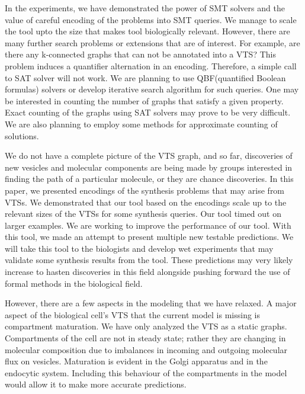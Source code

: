 \noindent 
%
In the experiments, we have demonstrated the power of SMT solvers and the
value of careful encoding of the problems into SMT queries. 
%
We manage to scale the tool upto the size that makes tool biologically relevant. However, there are many further search problems or extensions that are of interest. 
%
For example, are there any k-connected graphs that can not be annotated into a VTS? 
%
This problem induces a quantifier alternation in an encoding. Therefore, a simple call to SAT solver will not work. 
%
We are planning to use QBF(quantified Boolean
formulas) solvers or develop iterative search algorithm for such queries.
%
One may be interested in counting the number of graphs that satisfy a given
property. 
%
Exact counting of the graphs using SAT solvers may prove to be very
difficult. 
%
We are also planning to employ some methods for approximate counting
of solutions.

We do not have a complete picture of the VTS graph, and so far, discoveries of new vesicles and molecular components are being made by groups interested in finding the path of a particular molecule, or they are chance discoveries. 
%
In this paper, we presented encodings of the synthesis problems
that may arise from VTSs.
%
%
We demonstrated that our tool based on the encodings
scale up to the relevant sizes of the VTSs for some synthesis queries.
%
Our tool timed out on larger examples.
%
We are working to improve the performance of our tool.
%
%
With this tool, we made an attempt to present multiple new testable predictions. 
%
We will take this tool to the biologists and develop wet experiments that may validate some synthesis results from the tool.
%
These predictions may very likely increase to hasten discoveries in this field alongside pushing forward the use of formal methods in the biological field.

%
However, there are a few aspects in the modeling that we have relaxed.
A major aspect of the biological cell’s VTS that the current model is missing is compartment maturation. 
%
We have only analyzed the VTS as a static graphs.
%
Compartments of the cell are not in steady state; rather they are changing in molecular composition due to imbalances in incoming and outgoing molecular flux on vesicles.
%
Maturation  is  evident  in  the  Golgi  apparatus  and  in  the  endocytic system. 
%
Including this behaviour of the compartments in the model would allow it to make more accurate predictions.
